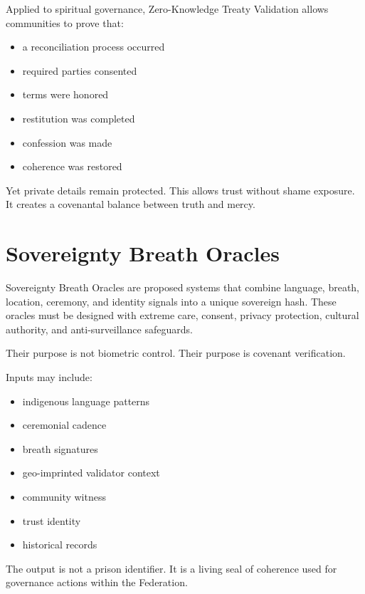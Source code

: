 \documentclass[12pt]{article}
\begin{document}
Applied to spiritual governance, Zero-Knowledge Treaty Validation allows communities to prove that:

\begin{itemize}
  \item a reconciliation process occurred
  \item required parties consented
  \item terms were honored
  \item restitution was completed
  \item confession was made
  \item coherence was restored
\end{itemize}

Yet private details remain protected. This allows trust without shame exposure. It creates a covenantal balance between truth and mercy.

\section{Sovereignty Breath Oracles}

Sovereignty Breath Oracles are proposed systems that combine language, breath, location, ceremony, and identity signals into a unique sovereign hash. These oracles must be designed with extreme care, consent, privacy protection, cultural authority, and anti-surveillance safeguards.

Their purpose is not biometric control. Their purpose is covenant verification.

Inputs may include:

\begin{itemize}
  \item indigenous language patterns
  \item ceremonial cadence
  \item breath signatures
  \item geo-imprinted validator context
  \item community witness
  \item trust identity
  \item historical records
\end{itemize}

The output is not a prison identifier. It is a living seal of coherence used for governance actions within the Federation.

\end{document}
